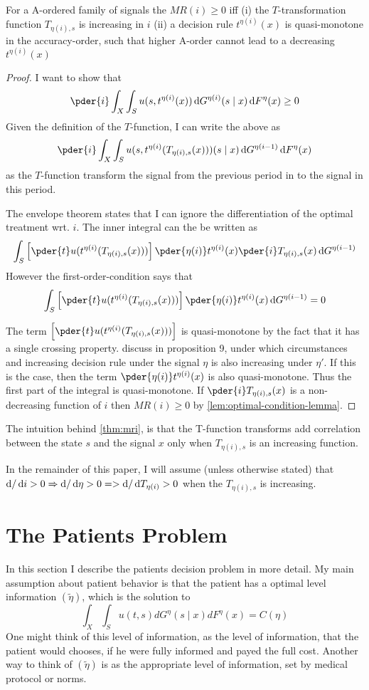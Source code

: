 \begin{theorem}\label{thm:mri}
For a A-ordered family of signals the $MR(i)\geq0$ iff (i) the $T$-transformation function $T_{\eta(i),s}$ is increasing in $i$ (ii) a decision rule $t^{\eta(i)}(x)$ is quasi-monotone in the accuracy-order, such that higher A-order cannot lead to a decreasing $t^{\eta(i)}(x)$
\end{theorem}
\begin{proof}
I want to show that
\[
	\pder{i}\int_X\int_S u(s,t^{\eta(i)}(x))\dif G^{\eta(i)}(s\mid x)\dif F^\eta(x)\geq0
\]
Given the definition of the $T$-function, I can write the above as
\[
	\pder{i}\int_X\int_S u(s,t^{\eta(i)}(T_{\eta(i),s}(x)))(s\mid x)\dif G^{\eta(i-1)}\dif F^\eta(x)
\]
as the $T$-function transform the signal from the previous period in to the signal in this period.

The envelope theorem states that I can ignore the differentiation of the optimal treatment wrt. $i$. The inner integral can the be written as
\[
	\int_S \left[\pder{t}u(t^{\eta(i)}(T_{\eta(i),s}(x)))\right]\pder{\eta(i)}t^{\eta(i)}(x)\pder{i}T_{\eta(i),s}(x)\dif G^{\eta(i-1)}
\]
However the first-order-condition says that
\[
	\int_S \left[\pder{t}u(t^{\eta(i)}(T_{\eta(i),s}(x)))\right]\pder{\eta(i)}t^{\eta(i)}(x)\dif G^{\eta(i-1)}=0
\]

The term $\left[\pder{t}u(t^{\eta(i)}(T_{\eta(i),s}(x)))\right]$ is quasi-monotone by the fact that it has a single crossing property. \textcite{Quah2009Comparative} discuss in proposition 9, under which circumstances and increasing decision rule under the signal $\eta$ is also increasing under $\eta'$. If this is the case, then the term $\pder{\eta(i)}t^{\eta(i)}(x)$ is also quasi-monotone. Thus the first part of the integral is quasi-monotone. If $\pder{i}T_{\eta(i),s}(x)$ is a non-decreasing function of $i$ then $MR(i)\geq0$ by \cref{lem:optimal-condition-lemma}.
\end{proof}
The intuition behind \cref{thm:mri}, is that the T-function transforms add correlation between the state $s$ and the signal $x$ only when $T_{\eta(i),s}$ is an increasing function. 

In the remainder of this paper, I will assume (unless otherwise stated) that $\dif /\dif i >0 \Rightarrow \dif/\dif \eta >0 => \dif / \dif T_{\eta(i)}>0$ when the $T_{\eta(i),s}$ is increasing. 

\section{The Patients Problem} %
\label{sec:the_patients_problem}
In this section I describe the patients decision problem in more detail. My main assumption about patient behavior is that the patient has a optimal level information $(\tilde{\eta})$, which is the solution to
\[
    \int_X\int_S u(t,s)dG^{\eta}(s\mid x)dF^\eta(x)=C(\eta)
\]
One might think of this level of information, as the level of information, that the patient would chooses, if he were fully informed and payed the full cost. Another way to think of $(\tilde{\eta})$ is as the appropriate level of information, set by medical protocol or norms.

